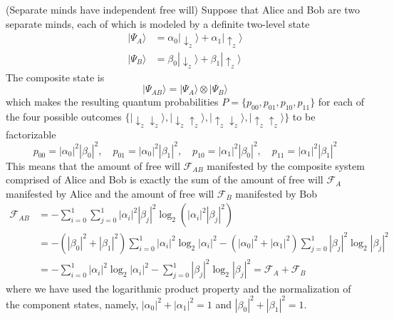 \documentclass{ws-ijmpb}
\begin{document}
\begin{example}
(Separate minds have independent free will) Suppose that Alice and
Bob are two separate minds, each of which is modeled by a definite
two-level state
\begin{align}
|\Psi_{A}\rangle & =\alpha_{0}|\downarrow_{z}\rangle+\alpha_{1}|\uparrow_{z}\rangle\\
|\Psi_{B}\rangle & =\beta_{0}|\downarrow_{z}\rangle+\beta_{1}|\uparrow_{z}\rangle
\end{align}
The composite state is 
\begin{equation}
|\Psi_{AB}\rangle=|\Psi_{A}\rangle\otimes|\Psi_{B}\rangle
\end{equation}
which makes the resulting quantum probabilities $P=\{p_{00},p_{01},p_{10},p_{11}\}$
for each of the four possible outcomes $\{|\downarrow_{z}\downarrow_{z}\rangle,|\downarrow_{z}\uparrow_{z}\rangle,|\uparrow_{z}\downarrow_{z}\rangle,|\uparrow_{z}\uparrow_{z}\rangle\}$
to be factorizable 
\begin{equation}
p_{00}=\left|\alpha_{0}\right|^{2}\left|\beta_{0}\right|^{2},\quad p_{01}=\left|\alpha_{0}\right|^{2}\left|\beta_{1}\right|^{2},\quad p_{10}=\left|\alpha_{1}\right|^{2}\left|\beta_{0}\right|^{2},\quad p_{11}=\left|\alpha_{1}\right|^{2}\left|\beta_{1}\right|^{2}
\end{equation}
This means that the amount of free will $\mathscr{F}_{AB}$ manifested
by the composite system comprised of Alice and Bob is exactly the
sum of the amount of free will $\mathscr{F}_{A}$ manifested by Alice
and the amount of free will $\mathscr{F}_{B}$ manifested by Bob 
\begin{align}
\mathscr{F}_{AB} & =-\sum_{i=0}^{1}\sum_{j=0}^{1}\left|\alpha_{i}\right|^{2}\left|\beta_{j}\right|^{2}\log_{2}\left(\left|\alpha_{i}\right|^{2}\left|\beta_{j}\right|^{2}\right)\nonumber \\
 & =-\left(\left|\beta_{0}\right|^{2}+\left|\beta_{1}\right|^{2}\right)\sum_{i=0}^{1}\left|\alpha_{i}\right|^{2}\log_{2}\left|\alpha_{i}\right|^{2}-\left(\left|\alpha_{0}\right|^{2}+\left|\alpha_{1}\right|^{2}\right)\sum_{j=0}^{1}\left|\beta_{j}\right|^{2}\log_{2}\left|\beta_{j}\right|^{2}\nonumber \\
 & =-\sum_{i=0}^{1}\left|\alpha_{i}\right|^{2}\log_{2}\left|\alpha_{i}\right|^{2}-\sum_{j=0}^{1}\left|\beta_{j}\right|^{2}\log_{2}\left|\beta_{j}\right|^{2}=\mathscr{F}_{A}+\mathscr{F}_{B}
\end{align}
where we have used the logarithmic product property and the normalization
of the component states, namely, $\left|\alpha_{0}\right|^{2}+\left|\alpha_{1}\right|^{2}=1$
and $\left|\beta_{0}\right|^{2}+\left|\beta_{1}\right|^{2}=1$.
\end{example}
\end{document}
